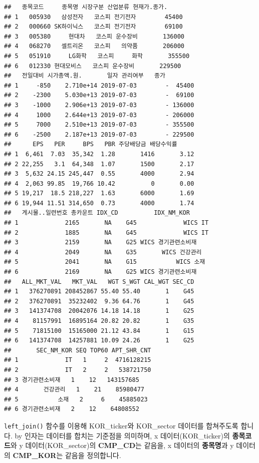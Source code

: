 \documentclass[12pt,]{book}
\begin{document}
\begin{verbatim}
##   종목코드     종목명 시장구분 산업분류 현재가.종가.
## 1   005930   삼성전자   코스피 전기전자        45400
## 2   000660 SK하이닉스   코스피 전기전자        69100
## 3   005380     현대차   코스피 운수장비       136000
## 4   068270   셀트리온   코스피   의약품       206000
## 5   051910     LG화학   코스피     화학       355500
## 6   012330 현대모비스   코스피 운수장비       229500
##   전일대비 시가총액.원.       일자 관리여부   종가
## 1     -850    2.710e+14 2019-07-03        -  45400
## 2    -2300    5.030e+13 2019-07-03        -  69100
## 3    -1000    2.906e+13 2019-07-03        - 136000
## 4     1000    2.644e+13 2019-07-03        - 206000
## 5     7000    2.510e+13 2019-07-03        - 355500
## 6    -2500    2.187e+13 2019-07-03        - 229500
##      EPS   PER     BPS   PBR 주당배당금 배당수익률
## 1  6,461  7.03  35,342  1.28       1416       3.12
## 2 22,255   3.1  64,348  1.07       1500       2.17
## 3  5,632 24.15 245,447  0.55       4000       2.94
## 4  2,063 99.85  19,766 10.42          0       0.00
## 5 19,217  18.5 218,227  1.63       6000       1.69
## 6 19,944 11.51 314,650  0.73       4000       1.74
##   게시물..일련번호 총카운트 IDX_CD          IDX_NM_KOR
## 1             2165       NA    G45             WICS IT
## 2             1885       NA    G45             WICS IT
## 3             2159       NA    G25 WICS 경기관련소비재
## 4             2049       NA    G35       WICS 건강관리
## 5             2041       NA    G15           WICS 소재
## 6             2169       NA    G25 WICS 경기관련소비재
##   ALL_MKT_VAL   MKT_VAL   WGT S_WGT CAL_WGT SEC_CD
## 1   376270891 208452867 55.40 55.40       1    G45
## 2   376270891  35232402  9.36 64.76       1    G45
## 3   141374708  20042076 14.18 14.18       1    G25
## 4    81157991  16895164 20.82 20.82       1    G35
## 5    71815100  15165000 21.12 43.84       1    G15
## 6   141374708  14257881 10.09 24.26       1    G25
##       SEC_NM_KOR SEQ TOP60 APT_SHR_CNT
## 1             IT   1     2  4716128215
## 2             IT   2     2   538721750
## 3 경기관련소비재   1    12   143157685
## 4       건강관리   1    21    85980477
## 5           소재   2     6    45885023
## 6 경기관련소비재   2    12    64808552
\end{verbatim}

\texttt{left\_join()} 함수를 이용해 KOR\_ticker와 KOR\_sector 데이터를 합쳐주도록 합니다. by 인자는 데이터를 합치는 기준점을 의미하며, x 데이터(KOR\_ticker)의 \textbf{종목코드}와 y 데이터(KOR\_sector)의 \textbf{CMP\_CD}는 같음을, x 데이터의 \textbf{종목명}과 y 데이터의 \textbf{CMP\_KOR}는 같음을 정의합니다.
\end{document}
